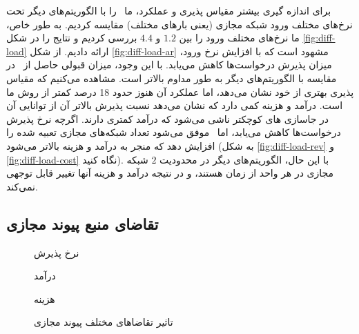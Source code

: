     برای اندازه گیری بیشتر مقیاس پذیری و عملکرد‌، ما \ourAlg\ را با الگوریتم‌های دیگر تحت نرخ‌های مختلف ورود شبکه مجازی (یعنی بار‌های مختلف) مقایسه کردیم. به طور خاص‌، ما نرخ‌های مختلف ورود را بین $ 1.2 $ و $ 4.4 $ بررسی کردیم  و نتایج را در شکل  \ref{fig:diff-load}  ارائه دادیم.
    از شکل \ref{fig:diff-load-ar} مشهود است که با افزایش نرخ ورود‌، میزان پذیرش درخواست‌ها کاهش می‌یابد. با این وجود‌، میزان قبولی حاصل از \ourAlg\ در مقایسه با الگوریتم‌های دیگر به طور مداوم بالاتر است. مشاهده می‌کنیم که  مقیاس پذیری بهتری از خود نشان می‌دهد‌، اما عملکرد آن هنوز حدود 18 درصد کمتر از روش ما است.  درآمد و هزینه کمی دارد که نشان می‌دهد نسبت پذیرش بالاتر آن از توانایی آن در جاسازی ‌های کوچکتر ناشی می‌شود که درآمد کمتری دارند.
     اگرچه نرخ پذیرش درخواست‌ها کاهش می‌یابد‌، اما \ourAlg\ موفق می‌شود تعداد شبکه‌های مجازی تعبیه شده را افزایش دهد که منجر به درآمد و هزینه بالاتر می‌شود (به شکل \ref{fig:diff-load-rev} و \ref{fig:diff-load-cost} نگاه کنید). با این حال‌، الگوریتم‌های دیگر در محدودیت $ 2 $ شبکه مجازی در هر واحد از زمان هستند‌، و در نتیجه درآمد و هزینه آنها تغییر قابل توجهی نمی‌کند.
     
      \subsection{تقاضای منبع پیوند مجازی}
      
      \begin{figure*}[t]
      	\centering
      	\begin{minipage}{.29\linewidth}
      		\centering
      		\resizebox{\linewidth}{!}{%
      			
      		}%
      		\caption{نرخ پذیرش}
      		\label{fig:diff-link-ar}
      	\end{minipage}
      	\hfil
      	\begin{minipage}{.29\linewidth}
      		\centering
      		\resizebox{\linewidth}{!}{%
      			
      		}%
      		\caption{درآمد}
      		\label{fig:diff-link-rev}
      	\end{minipage}
      	\hfil
      	\begin{minipage}{.29\linewidth}
      		\centering
      		\resizebox{\linewidth}{!}{%
      			
      		}%
      		\caption{هزینه}
      		\label{fig:diff-link-cost}
      	\end{minipage}
      	\caption{تاثیر تقاضاهای مختلف پیوند‌ مجازی}
      	\label{fig:diff-link}
      \end{figure*}
  
